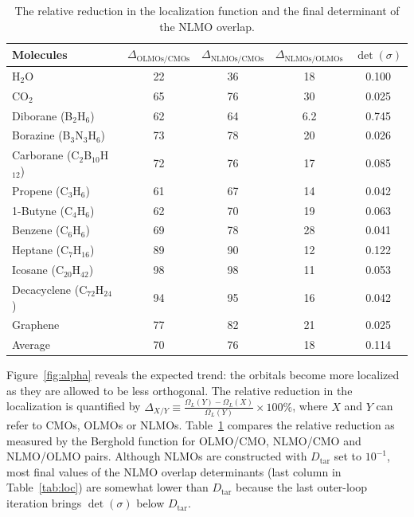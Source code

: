 \documentclass[aps,prl,reprint,amsmath,amssymb]{revtex4-1}
\begin{document}
\begin{table}[htbp]
\caption{The relative reduction in the localization function and the final determinant of the NLMO overlap.}
\label{tab:loc}
\centering
\begin{tabular}{l c c c c}
\hline\hline
Molecules & $\Delta_{\text{OLMOs/CMOs}}$  & $\Delta_{\text{NLMOs/CMOs}}$ & $\Delta_{\text{NLMOs/OLMOs}}$ & $\det(\sigma)$ \\
\hline
H$_2$O & 22 & 36 & 18 & 0.100 \\ 
CO$_2$ & 65 & 76 & 30 & 0.025 \\
Diborane (B$_2$H$_6$) & 62 & 64 & 6.2 & 0.745 \\
Borazine (B$_3$N$_3$H$_6$) & 73 & 78 & 20 & 0.026 \\
Carborane (C$_2$B$_{10}$H$_{12}$) & 72 & 76 & 17 & 0.085 \\ 
Propene (C$_3$H$_6$) & 61 & 67 & 14 & 0.042 \\
1-Butyne (C$_4$H$_6$) & 62 & 70 & 19 & 0.063 \\
Benzene (C$_6$H$_6$) & 69 & 78 & 28 & 0.041 \\ 
Heptane (C$_7$H$_{16}$) & 89 & 90 & 12 & 0.122 \\ 
Icosane (C$_{20}$H$_{42}$) & 98 & 98 & 11 & 0.053 \\ 
Decacyclene (C$_{72}$H$_{24}$) & 94 & 95 & 16 & 0.042 \\ 
Graphene & 77 & 82 & 21 & 0.025 \\
\hline
Average & 70 & 76 & 18 & 0.114 \\
\hline
\hline
\end{tabular}
\label{table:nonlin}
\end{table}

Figure~\ref{fig:alpha} reveals the expected trend: the orbitals become more localized as they are allowed to be less orthogonal. 
The relative reduction in the localization is quantified by $\Delta_{X/Y} \equiv \frac{\Omega_L(Y)-\Omega_L(X)}{\Omega_L(Y)} \times 100 \%$, where $X$ and $Y$ can refer to CMOs, OLMOs or NLMOs.
Table~\ref{table:nonlin} compares the relative reduction as measured by the Berghold function for OLMO/CMO, NLMO/CMO and NLMO/OLMO pairs. Although NLMOs are constructed with $D_{\text{tar}}$ set to $10^{-1}$, most final values of the NLMO overlap determinants (last column in Table~\ref{tab:loc}) are somewhat lower than $D_{\text{tar}}$ because the last outer-loop iteration brings $\det(\sigma)$ below $D_{\text{tar}}$. %
\end{document}
